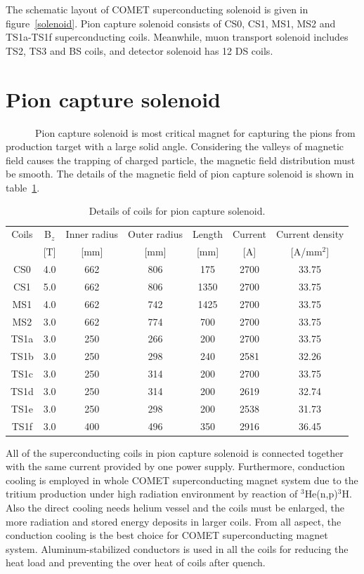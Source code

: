 The schematic layout of COMET superconducting solenoid is given in figure~\ref{solenoid}.
Pion capture solenoid consists of CS0, CS1, MS1, MS2 and TS1a-TS1f superconducting coils.
Meanwhile, muon transport solenoid includes TS2, TS3 and BS coils, and detector solenoid has 12 DS coils.


 \section{Pion capture solenoid}
~~~~~~Pion capture solenoid is most critical magnet for capturing the pions from production target with a large solid angle.
Considering the valleys of magnetic field causes the trapping of charged particle, the magnetic field distribution must be smooth.
The details of the magnetic field of pion capture solenoid is shown in table~\ref{magfldcs}.
\begin{table}[H]
 \centering
 \begin{tabular}{ccccccc} \hline \hline
  Coils & B$_z$ & Inner radius & Outer radius & Length & Current & Current density \\
   & [T] & [mm] & [mm] & [mm] & [A] & [A/mm$^2$] \\ \hline
  CS0 & 4.0 & 662 & 806 & 175 & 2700 & 33.75 \\
  CS1 & 5.0 & 662 & 806 & 1350 & 2700 & 33.75 \\
  MS1 & 4.0 & 662 & 742 & 1425 & 2700 & 33.75 \\
  MS2 & 3.0 & 662 & 774 & 700 & 2700 & 33.75 \\
  TS1a & 3.0 & 250 & 266 & 200 & 2700 & 33.75 \\
  TS1b & 3.0 & 250 & 298 & 240 & 2581 & 32.26 \\
  TS1c & 3.0 & 250 & 314 & 200 & 2700 & 33.75 \\
  TS1d & 3.0 & 250 & 314 & 200 & 2619 & 32.74 \\
  TS1e & 3.0 & 250 & 298 & 200 & 2538 & 31.73 \\
  TS1f & 3.0 & 400 & 496 & 350 & 2916 & 36.45 \\ \hline \hline
 \end{tabular}
 \caption{Details of coils for pion capture solenoid.}
 \label{magfldcs}
\end{table}
All of the superconducting coils in pion capture solenoid is connected together with the same current provided by one power supply.
Furthermore, conduction cooling is employed in whole COMET superconducting magnet system due to the tritium production under high radiation environment by reaction of $^3$He(n,p)$^3$H.
Also the direct cooling needs helium vessel and the coils must be enlarged, the more radiation and stored energy deposits in larger coils.
From all aspect, the conduction cooling is the best choice for COMET superconducting magnet system.
Aluminum-stabilized conductors is used in all the coils for reducing the heat load and preventing the over heat of coils after quench.

